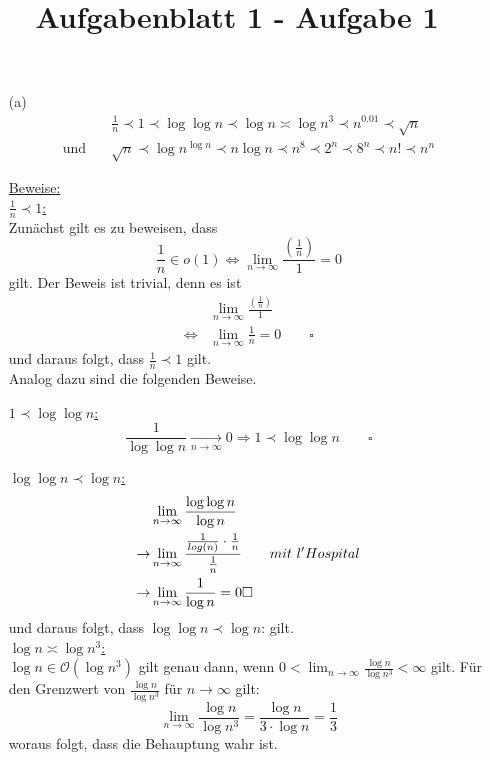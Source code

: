 \documentclass{article}
\title{Aufgabenblatt 1 - Aufgabe 1}
\author{}
\begin{document}
\maketitle

\begin{enumerate}
\item[(a)]
    \begin{align*}
        &\frac{1}{n} \prec 1 \prec \log \log n \prec \log n \asymp \log n^3 \prec
        n^{0.01} \prec \sqrt{n}  \\
        \text{und} \quad &\sqrt{n} \prec \log n^{\log n} \prec n \log n \prec n^8 \prec 
        2^n \prec 8^n \prec n! \prec n^n
    \end{align*}


\underline{Beweise:}\\
\underline{$\frac{1}{n} \prec 1$:} \\
Zunächst gilt es zu beweisen, dass
\[
    \frac{1}{n} \in o(1) \Leftrightarrow \lim_{n \to \infty}
    \frac{\left( \frac{1}{n} \right)}{1} = 0
\]
gilt. Der Beweis ist trivial, denn es ist
\begin{align*}
    &\lim_{n \to \infty} \frac{\left( \frac{1}{n} \right)}{1} \\
    \Leftrightarrow &\lim_{n \to \infty} \frac{1}{n} = 0 \quad \quad \square
\end{align*}
und daraus folgt, dass $\frac{1}{n} \prec 1$ gilt.\\
Analog dazu sind die folgenden Beweise.

\underline{$1 \prec \log \log n$:}
\[
    \frac{1}{\log \log n} \underset{n \to \infty}{\longrightarrow} 0 \Rightarrow
    1 \prec \log \log n \qquad \square
\]

\underline{$\log \log n \prec \log n$:} \\ %
\begin{align*}
    &\lim_{n \to \infty} \frac{\log \log n }{\log n} \\
    \rightarrow &\lim_{n \to \infty} \frac{\frac{1}{log(n)} \cdot \frac{1}{n}}{\frac{1}{n}} \qquad mit ~ l'Hospital \\
    \rightarrow &\lim_{n \to \infty} \frac{1}{\log n} = 0 \hfill \square
\end{align*}
und daraus folgt, dass {$\log \log n \prec \log n$:} gilt.\\

\underline{$\log n \asymp \log n^3$:}\\
$\log n \in \mathcal{O}(\log n^3)$ gilt genau dann, wenn $0 < \lim_{n \to \infty} \frac{\log
n}{\log n^3} < \infty$ gilt. Für den Grenzwert von $\frac{\log n}{\log n^3}$ für
$n \to \infty$ gilt:
\[
    \lim_{n \to \infty} \frac{\log n}{\log n^3} = \frac{\log n}{3 \cdot \log n}
    = \frac{1}{3}
\]
woraus folgt, dass die Behauptung wahr ist.


\end{enumerate}
\end{document}
